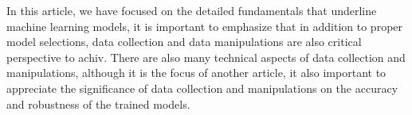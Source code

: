 
\par
In this article, we have focused on the detailed fundamentals that underline machine learning models, it is important to emphasize that in addition to proper model selections, data collection and data manipulations are also critical perspective to achiv. There are also many technical aspects of data collection and manipulations, although it is the focus of another article, it also important to appreciate the significance of data collection and manipulations on the accuracy and robustness of the trained models.
\par 

